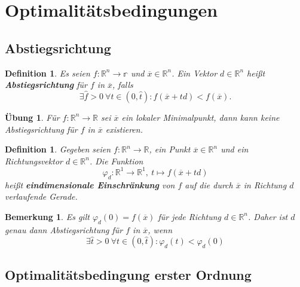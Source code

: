\documentclass[11pt]{scrreprt}
\newcounter{thm}
\theoremstyle{thmstyle}
\numberwithin{thm}{section}
\newtheorem{definition}[thm]{Definition}
\newtheorem{uebung}[thm]{Übung}
\newtheorem*{bemerkung*}{Bemerkung}
\begin{document}
\setcounter{chapter}{2}
\setcounter{section}{1}

\newpage

\section*{Optimalitätsbedingungen}

\subsection*{Abstiegsrichtung}

\begin{definition}
	Es seien $f \colon \mathbb{R}^n \rightarrow \mathbb{r}$ und $\overline{x} \in \mathbb{R}^n$. Ein Vektor $d \in \mathbb{R}^n$ heißt \textbf{Abstiegsrichtung} für $f$ in $\overline{x}$, falls
	$$ \exists \hat{f} > 0 ~\forall t \in (0, \hat{t}) \colon f(\overline{x} + td) < f(\overline{x}). $$
\end{definition}

\begin{uebung}
	Für $f \colon \mathbb{R}^n \rightarrow \mathbb{R}$ sei $\overline{x}$ ein lokaler Minimalpunkt, dann kann keine Abstiegsrichtung für $f$ in $\overline{x}$ existieren.
\end{uebung}

\begin{definition}
	Gegeben seien $f \colon \mathbb{R}^n \rightarrow \mathbb{R}$, ein Punkt $\overline{x} \in \mathbb{R}^n$ und ein Richtungsvektor $d \in \mathbb{R}^n$. Die Funktion
	$$ \varphi_d \colon \mathbb{R}^1 \rightarrow
	 \mathbb{R}^1, ~ t \mapsto f(\overline{x} + td) $$
	 heißt \textbf{eindimensionale Einschränkung} von $f$ auf die durch $\overline{x}$ in Richtung $d$ verlaufende Gerade.
\end{definition}

\begin{bemerkung*}
		Es gilt $\varphi_d(0) = f(\overline{x})$ für jede Richtung $d \in \mathbb{R}^n$. Daher ist $d$ genau dann Abstiegsrichtung für $f$ in $\overline{x}$, wenn
		$$ \exists \hat{t} > 0 ~\forall t \in (0, \hat{t}) \colon \varphi_d(t) < \varphi_d(0) $$
\end{bemerkung*}

\subsection*{Optimalitätsbedingung erster Ordnung}
\end{document}
